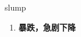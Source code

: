 
\begin{frame}
{\huge slump}
\begin{center}
\begin{enumerate}\Large
  \item \textbf{暴跌，急剧下降}
\end{enumerate}
\end{center}
\end{frame}
